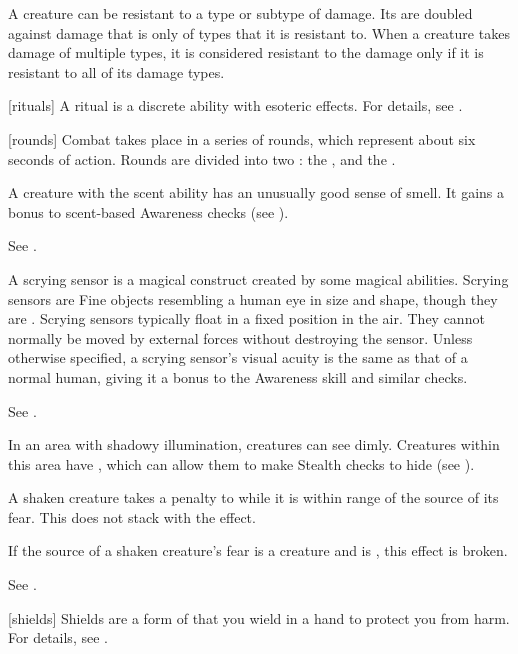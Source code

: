  A creature can be resistant to a type or subtype of damage.
Its  are doubled against damage that is only of types that it is resistant to.
When a creature takes damage of multiple types, it is considered resistant to the damage only if it is resistant to all of its damage types.

[rituals] A ritual is a discrete  ability with esoteric effects.
For details, see .

[rounds] Combat takes place in a series of rounds, which represent about six seconds of action.
Rounds are divided into two : the , and the .

 A creature with the scent ability has an unusually good sense of smell.
It gains a  bonus to scent-based Awareness checks (see ).

 See .

 A scrying sensor is a magical construct created by some magical abilities.
Scrying sensors are Fine objects resembling a human eye in size and shape, though they are .
Scrying sensors typically float in a fixed position in the air.
They cannot normally be moved by external forces without destroying the sensor.
Unless otherwise specified, a scrying sensor's visual acuity is the same as that of a normal human, giving it a  bonus to the Awareness skill and similar checks.

 See .

 In an area with shadowy illumination, creatures can see dimly.
Creatures within this area have \concealment, which can allow them to make Stealth checks to hide (see ).

 A shaken creature takes a  penalty to  while it is within \rngclose range of the source of its fear.
This does not stack with the  effect.

If the source of a shaken creature's fear is a creature and is , this effect is broken.

 See .

[shields] Shields are a form of  that you wield in a hand to protect you from harm.
For details, see .

